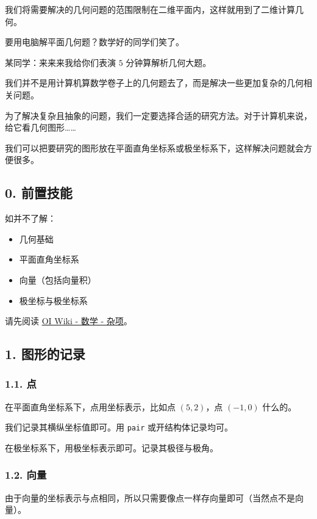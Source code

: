 
我们将需要解决的几何问题的范围限制在二维平面内，这样就用到了二维计算几何。

要用电脑解平面几何题？数学好的同学们笑了。

\begin{QUOTE}{}{}
某同学：来来来我给你们表演 $5$ 分钟算解析几何大题。
\end{QUOTE}

我们并不是用计算机算数学卷子上的几何题去了，而是解决一些更加复杂的几何相关问题。

为了解决复杂且抽象的问题，我们一定要选择合适的研究方法。对于计算机来说，给它看几何图形……

我们可以把要研究的图形放在平面直角坐标系或极坐标系下，这样解决问题就会方便很多。

\subsection{0. 前置技能}

如并不了解：

\begin{itemize}
\item 几何基础
\item 平面直角坐标系
\item 向量（包括向量积）
\item 极坐标与极坐标系
\end{itemize}

请先阅读 \href{/math/misc/}{OI Wiki - 数学 - 杂项}。

\subsection{1. 图形的记录}

\subsubsection{1.1. 点}

在平面直角坐标系下，点用坐标表示，比如点 $(5,2)$，点 $(-1,0)$ 什么的。

我们记录其横纵坐标值即可。用 \texttt{pair} 或开结构体记录均可。

在极坐标系下，用极坐标表示即可。记录其极径与极角。

\subsubsection{1.2. 向量}

由于向量的坐标表示与点相同，所以只需要像点一样存向量即可（当然点不是向量）。

